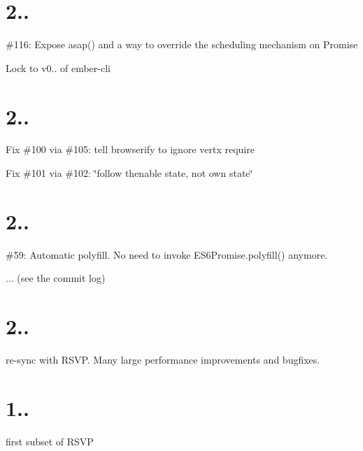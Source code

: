 \section*{2..}


\begin{DoxyItemize}
\item \#116\+: Expose asap() and a way to override the scheduling mechanism on Promise
\item Lock to v0.. of ember-\/cli
\end{DoxyItemize}

\section*{2..}


\begin{DoxyItemize}
\item Fix \#100 via \#105\+: tell browserify to ignore vertx require
\item Fix \#101 via \#102\+: \char`\"{}follow thenable state, not own state\char`\"{}
\end{DoxyItemize}

\section*{2..}


\begin{DoxyItemize}
\item \#59\+: Automatic polyfill. No need to invoke {\ttfamily E\+S6\+Promise.\+polyfill()} anymore.
\item ... (see the commit log)
\end{DoxyItemize}

\section*{2..}


\begin{DoxyItemize}
\item re-\/sync with R\+S\+VP. Many large performance improvements and bugfixes.
\end{DoxyItemize}

\section*{1..}


\begin{DoxyItemize}
\item first subset of R\+S\+VP 
\end{DoxyItemize}